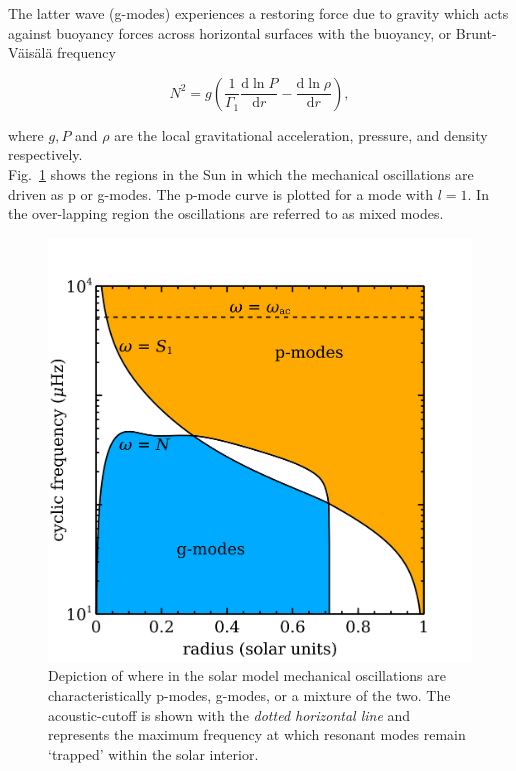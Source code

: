 The latter wave (g-modes) 
experiences a restoring force due to gravity which acts against 
buoyancy forces across horizontal surfaces with the buoyancy, or 
Brunt-V\"{a}is\"{a}l\"{a} frequency 
 
\begin{equation}
N^2 = g \left( \frac{1}{\Gamma_1} \frac{\mathrm{d} \ln{P}}{\mathrm{d}r} - 
\frac{\mathrm{d} \ln{\rho}}{\mathrm{d}r} \right),
\end{equation}

\noindent where $g,P$ and $\rho$ are the local gravitational acceleration, 
pressure, and density respectively. \\

Fig.~\ref{fig:propagation} shows the regions in the Sun in which the mechanical 
oscillations are driven as p or g-modes. The p-mode curve is plotted for a 
mode with $l=1$. In the over-lapping region the oscillations are referred to as 
mixed modes. \\

\begin{figure}
\centering
\includegraphics[scale=.5]{figures/Propagation_diagram.png}
\caption{Depiction of where in the solar model mechanical oscillations are 
characteristically p-modes, g-modes, or a mixture of the two. The acoustic-cutoff 
is shown with the \emph{dotted horizontal line} and represents the maximum frequency 
at which resonant modes remain `trapped' within the solar interior.  
\parencite[Image credit:][]{christensen96} \label{fig:propagation}}
\end{figure}

